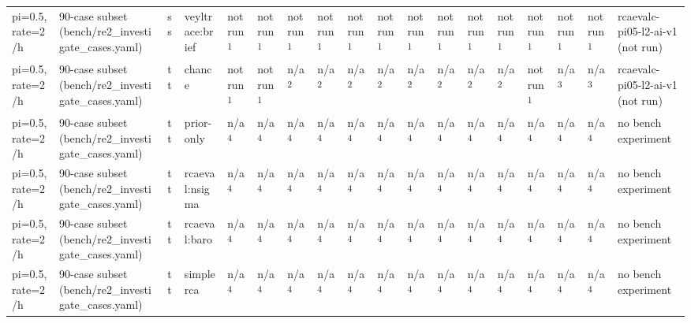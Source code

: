 \begin{table}[t]
\begin{tabular}{llllllllllllllllll}
pi=0.5, rate=2/h & 90-case subset (bench/re2\_investigate\_cases.yaml) & ss & veyltrace:brief & not run\textsuperscript{1} & not run\textsuperscript{1} & not run\textsuperscript{1} & not run\textsuperscript{1} & not run\textsuperscript{1} & not run\textsuperscript{1} & not run\textsuperscript{1} & not run\textsuperscript{1} & not run\textsuperscript{1} & not run\textsuperscript{1} & not run\textsuperscript{1} & not run\textsuperscript{1} & not run\textsuperscript{1} & rcaevalc-pi05-l2-ai-v1 (not run) \\
pi=0.5, rate=2/h & 90-case subset (bench/re2\_investigate\_cases.yaml) & tt & chance & not run\textsuperscript{1} & not run\textsuperscript{1} & n/a\textsuperscript{2} & n/a\textsuperscript{2} & n/a\textsuperscript{2} & n/a\textsuperscript{2} & n/a\textsuperscript{2} & n/a\textsuperscript{2} & n/a\textsuperscript{2} & n/a\textsuperscript{2} & not run\textsuperscript{1} & n/a\textsuperscript{3} & n/a\textsuperscript{3} & rcaevalc-pi05-l2-ai-v1 (not run) \\
pi=0.5, rate=2/h & 90-case subset (bench/re2\_investigate\_cases.yaml) & tt & prior-only & n/a\textsuperscript{4} & n/a\textsuperscript{4} & n/a\textsuperscript{4} & n/a\textsuperscript{4} & n/a\textsuperscript{4} & n/a\textsuperscript{4} & n/a\textsuperscript{4} & n/a\textsuperscript{4} & n/a\textsuperscript{4} & n/a\textsuperscript{4} & n/a\textsuperscript{4} & n/a\textsuperscript{4} & n/a\textsuperscript{4} & no bench experiment \\
pi=0.5, rate=2/h & 90-case subset (bench/re2\_investigate\_cases.yaml) & tt & rcaeval:nsigma & n/a\textsuperscript{4} & n/a\textsuperscript{4} & n/a\textsuperscript{4} & n/a\textsuperscript{4} & n/a\textsuperscript{4} & n/a\textsuperscript{4} & n/a\textsuperscript{4} & n/a\textsuperscript{4} & n/a\textsuperscript{4} & n/a\textsuperscript{4} & n/a\textsuperscript{4} & n/a\textsuperscript{4} & n/a\textsuperscript{4} & no bench experiment \\
pi=0.5, rate=2/h & 90-case subset (bench/re2\_investigate\_cases.yaml) & tt & rcaeval:baro & n/a\textsuperscript{4} & n/a\textsuperscript{4} & n/a\textsuperscript{4} & n/a\textsuperscript{4} & n/a\textsuperscript{4} & n/a\textsuperscript{4} & n/a\textsuperscript{4} & n/a\textsuperscript{4} & n/a\textsuperscript{4} & n/a\textsuperscript{4} & n/a\textsuperscript{4} & n/a\textsuperscript{4} & n/a\textsuperscript{4} & no bench experiment \\
pi=0.5, rate=2/h & 90-case subset (bench/re2\_investigate\_cases.yaml) & tt & simplerca & n/a\textsuperscript{4} & n/a\textsuperscript{4} & n/a\textsuperscript{4} & n/a\textsuperscript{4} & n/a\textsuperscript{4} & n/a\textsuperscript{4} & n/a\textsuperscript{4} & n/a\textsuperscript{4} & n/a\textsuperscript{4} & n/a\textsuperscript{4} & n/a\textsuperscript{4} & n/a\textsuperscript{4} & n/a\textsuperscript{4} & no bench experiment \\

\end{tabular}
\end{table}
